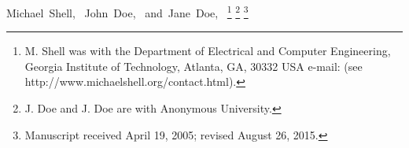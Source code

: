 Michael~Shell,~
John~Doe,~
and~Jane~Doe,~
\thanks{M. Shell was with the Department
of Electrical and Computer Engineering, Georgia Institute of Technology, Atlanta,
GA, 30332 USA e-mail: (see http://www.michaelshell.org/contact.html).}
\thanks{J. Doe and J. Doe are with Anonymous University.}
\thanks{Manuscript received April 19, 2005; revised August 26, 2015.}

